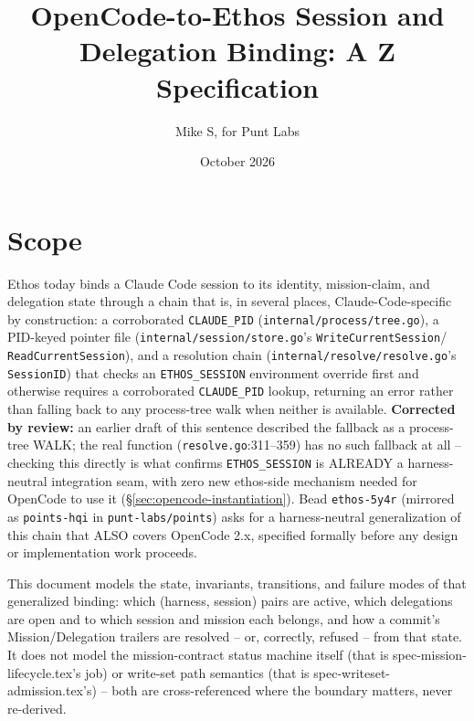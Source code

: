 \documentclass[a4paper,10pt,fleqn]{article}
\newcommand{\fpath}[1]{\texttt{#1}}
\newcommand{\field}[1]{\texttt{#1}}
\begin{document}
\title{OpenCode-to-Ethos Session and Delegation Binding: A Z Specification}
\author{Mike S, for Punt Labs}
\date{October 2026}
\maketitle
\tableofcontents
\newpage

\section{Scope}
\label{sec:scope}

Ethos today binds a Claude Code session to its identity, mission-claim,
and delegation state through a chain that is, in several places,
Claude-Code-specific by construction: a corroborated \field{CLAUDE\_PID}
(\fpath{internal/process/tree.go}), a PID-keyed pointer file
(\fpath{internal/session/store.go}'s \field{WriteCurrentSession}/
\field{ReadCurrentSession}), and a resolution chain
(\fpath{internal/resolve/resolve.go}'s \field{SessionID}) that checks an
\field{ETHOS\_SESSION} environment override first and otherwise
requires a corroborated \field{CLAUDE\_PID} lookup, returning an error
rather than falling back to any process-tree walk when neither is
available. \textbf{Corrected by review:} an earlier draft of this
sentence described the fallback as a process-tree WALK; the real
function (\fpath{resolve.go}:311--359) has no such fallback at all --
checking this directly is what confirms \field{ETHOS\_SESSION} is
ALREADY a harness-neutral integration seam, with zero new ethos-side
mechanism needed for OpenCode to use it (\S\ref{sec:opencode-instantiation}).
Bead
\field{ethos-5y4r} (mirrored as \field{points-hqi} in
\fpath{punt-labs/points}) asks for a harness-neutral generalization of
this chain that ALSO covers OpenCode 2.x, specified formally before any
design or implementation work proceeds.

This document models the state, invariants, transitions, and failure
modes of that generalized binding: which (harness, session) pairs are
active, which delegations are open and to which session and mission
each belongs, and how a commit's Mission/Delegation trailers are
resolved -- or, correctly, refused -- from that state. It does not model
the mission-contract status machine itself (that is
spec-mission-lifecycle.tex's job) or write-set path semantics (that is
spec-writeset-admission.tex's) -- both are cross-referenced where the
boundary matters, never re-derived.
\end{document}
